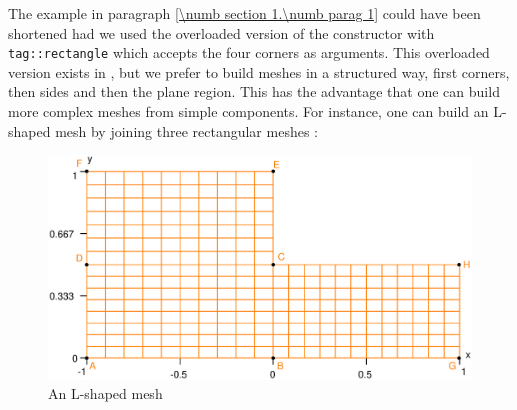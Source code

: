 The example in paragraph \ref{\numb section 1.\numb parag 1} could have been shortened
had we used the overloaded version of the {\small\tt {}} constructor with
{\small\tt \textcolor{tag}{tag}::rectangle} which accepts the four corners as arguments. 
This overloaded version exists in \maniFEM, but we prefer to build meshes in a structured way, 
first corners, then sides and then the plane region. 
This has the advantage that one can build more complex meshes from simple components. 
For instance, one can build an L-shaped mesh by joining three rectangular meshes :

\begin{figure}[ht] \centering
  \includegraphics[width=115mm]{L-shaped}
  \caption{An L-shaped mesh}
  \label{\numb section 1.\numb fig 5}
\end{figure}

